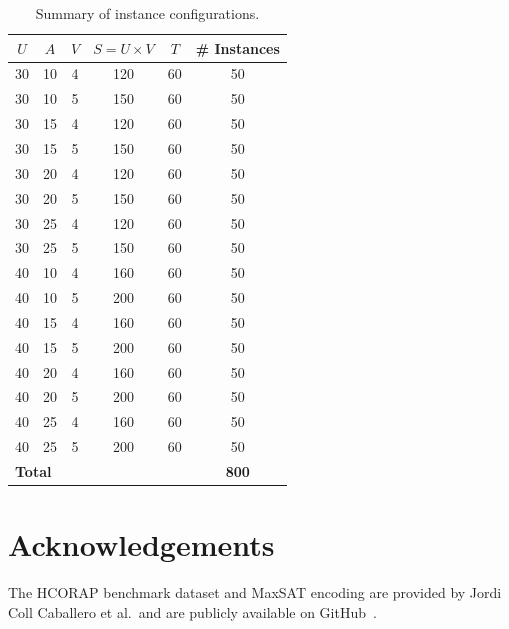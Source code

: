 \documentclass[11pt,a4paper]{article}
\begin{document}
\begin{table}[ht]
\centering
\caption{Summary of instance configurations.}
\label{tab:instances}
\begin{tabular}{cccccc}
\toprule
$U$ & $A$ & $V$ & $S = U \times V$ & $T$ & \# Instances \\
\midrule
30 & 10 & 4 & 120 & 60 & 50 \\
30 & 10 & 5 & 150 & 60 & 50 \\
30 & 15 & 4 & 120 & 60 & 50 \\
30 & 15 & 5 & 150 & 60 & 50 \\
30 & 20 & 4 & 120 & 60 & 50 \\
30 & 20 & 5 & 150 & 60 & 50 \\
30 & 25 & 4 & 120 & 60 & 50 \\
30 & 25 & 5 & 150 & 60 & 50 \\
\midrule
40 & 10 & 4 & 160 & 60 & 50 \\
40 & 10 & 5 & 200 & 60 & 50 \\
40 & 15 & 4 & 160 & 60 & 50 \\
40 & 15 & 5 & 200 & 60 & 50 \\
40 & 20 & 4 & 160 & 60 & 50 \\
40 & 20 & 5 & 200 & 60 & 50 \\
40 & 25 & 4 & 160 & 60 & 50 \\
40 & 25 & 5 & 200 & 60 & 50 \\
\midrule
\multicolumn{5}{l}{\textbf{Total}} & \textbf{800} \\
\bottomrule
\end{tabular}
\end{table}


\section*{Acknowledgements}

The HCORAP benchmark dataset and MaxSAT encoding are provided by Jordi Coll
Caballero et al.\ and are publicly available on GitHub~\cite{hcorap-github}.


\end{document}
